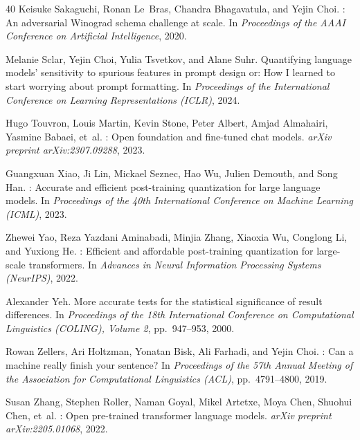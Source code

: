 \documentclass{article}
\begin{document}
\begin{thebibliography}{40}
Keisuke Sakaguchi, Ronan Le~Bras, Chandra Bhagavatula, and Yejin Choi.
: An adversarial {Winograd} schema challenge at scale.
\newblock In \emph{Proceedings of the AAAI Conference on Artificial Intelligence}, 2020.

Melanie Sclar, Yejin Choi, Yulia Tsvetkov, and Alane Suhr.
\newblock Quantifying language models' sensitivity to spurious features in prompt design or: How {I} learned to start worrying about prompt formatting.
\newblock In \emph{Proceedings of the International Conference on Learning Representations (ICLR)}, 2024.

Hugo Touvron, Louis Martin, Kevin Stone, Peter Albert, Amjad Almahairi, Yasmine Babaei, et~al.
: Open foundation and fine-tuned chat models.
\newblock \emph{arXiv preprint arXiv:2307.09288}, 2023.

Guangxuan Xiao, Ji Lin, Mickael Seznec, Hao Wu, Julien Demouth, and Song Han.
: Accurate and efficient post-training quantization for large language models.
\newblock In \emph{Proceedings of the 40th International Conference on Machine Learning (ICML)}, 2023.

Zhewei Yao, Reza Yazdani Aminabadi, Minjia Zhang, Xiaoxia Wu, Conglong Li, and Yuxiong He.
: Efficient and affordable post-training quantization for large-scale transformers.
\newblock In \emph{Advances in Neural Information Processing Systems (NeurIPS)}, 2022.

Alexander Yeh.
\newblock More accurate tests for the statistical significance of result differences.
\newblock In \emph{Proceedings of the 18th International Conference on Computational Linguistics (COLING), Volume 2}, pp.\ 947--953, 2000.

Rowan Zellers, Ari Holtzman, Yonatan Bisk, Ali Farhadi, and Yejin Choi.
: Can a machine really finish your sentence?
\newblock In \emph{Proceedings of the 57th Annual Meeting of the Association for Computational Linguistics (ACL)}, pp.\ 4791--4800, 2019.

Susan Zhang, Stephen Roller, Naman Goyal, Mikel Artetxe, Moya Chen, Shuohui Chen, et~al.
: Open pre-trained transformer language models.
\newblock \emph{arXiv preprint arXiv:2205.01068}, 2022.


\end{thebibliography}
\end{document}
